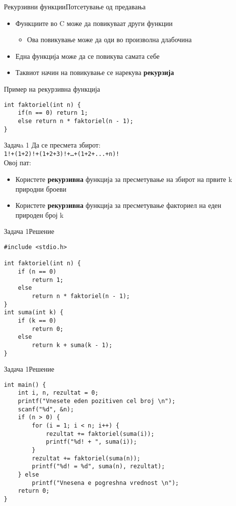 \begin{frame}[fragile]{Рекурзивни функции}{Потсетување од предавања}
\begin{itemize}
    \item Функциите во C може да повикуваат други функции
    \begin{itemize}
        \item Ова повикување може да оди во произволна длабочина
    \end{itemize}    
    \item Една функција може да се повикува самата себе
    \item Таквиот начин на повикување се нарекува \textbf{рекурзија}    
\end{itemize}
\begin{exampleblock}{Пример на рекурзивна функција}
\begin{lstlisting}
int faktoriel(int n) {
    if(n == 0) return 1;
    else return n * faktoriel(n - 1);
}
\end{lstlisting}
\end{exampleblock}
\end{frame}

\begin{frame}{Задачa 1}
Да се пресмета збирот:\\
\texttt{1!+(1+2)!+(1+2+3)!+\ldots+(1+2+...+n)!}
\\Овој пат:\\
\begin{itemize}
    \item Користете \textbf{рекурзивна} функција за пресметување на збирот на првите k
    природни броеви
    \item Користете \textbf{рекурзивна} функција за пресметување факториел на еден
    природен број k
\end{itemize}
\end{frame}

\begin{frame}[fragile]{Задача 1}{Решение}
\begin{lstlisting}
#include <stdio.h>

int faktoriel(int n) {
    if (n == 0)
        return 1;
    else
        return n * faktoriel(n - 1);
}
int suma(int k) {
    if (k == 0)
        return 0;
    else
        return k + suma(k - 1);
}
\end{lstlisting}
\end{frame}

\begin{frame}[fragile]{Задача 1}{Решение}
\begin{lstlisting}
int main() {
    int i, n, rezultat = 0;
    printf("Vnesete eden pozitiven cel broj \n");
    scanf("%d", &n);
    if (n > 0) {
        for (i = 1; i < n; i++) {
            rezultat += faktoriel(suma(i));
            printf("%d! + ", suma(i));
        }
        rezultat += faktoriel(suma(n));
        printf("%d! = %d", suma(n), rezultat);
    } else
        printf("Vnesena e pogreshna vrednost \n");
    return 0;
}
\end{lstlisting}
\end{frame}


